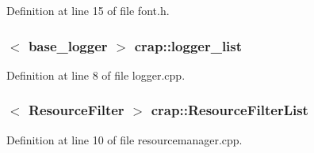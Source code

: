 Definition at line 15 of file font.\+h.

\hypertarget{namespacecrap_a7eddbc265d59efb9cfb0e3d97853f9f4}{
\subsubsection[{logger\+\_\+list}]{$<$ {\bf base\+\_\+logger} $>$ crap\+::logger\+\_\+list}}\label{namespacecrap_a7eddbc265d59efb9cfb0e3d97853f9f4}


Definition at line 8 of file logger.\+cpp.

\hypertarget{namespacecrap_afebe7139a7ca8c9be1349914a6f2acc6}{
\subsubsection[{Resource\+Filter\+List}]{$<$ {\bf Resource\+Filter} $>$ crap\+::\+Resource\+Filter\+List}}\label{namespacecrap_afebe7139a7ca8c9be1349914a6f2acc6}


Definition at line 10 of file resourcemanager.\+cpp.

